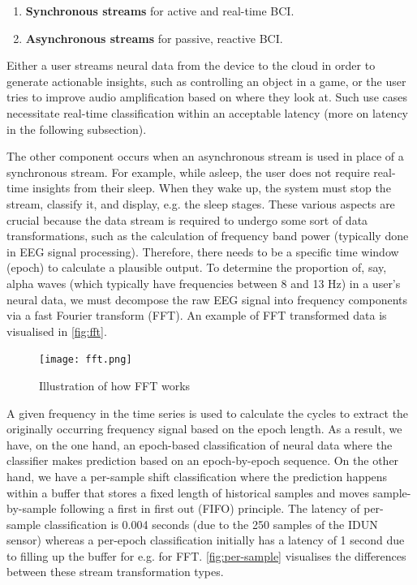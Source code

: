 \begin{enumerate}
  \item \textbf{Synchronous streams} for active and real-time BCI.
  \item \textbf{Asynchronous streams} for passive, reactive BCI.
\end{enumerate}

Either a user streams neural data from the device to the cloud in order to generate actionable insights, such as controlling an object in a game, or the user tries to improve audio amplification based on where they look at. Such use cases necessitate real-time classification within an acceptable latency (more on latency in the following subsection).

The other component occurs when an asynchronous stream is used in place of a synchronous stream. For example, while asleep, the user does not require real-time insights from their sleep. When they wake up, the system must stop the stream, classify it, and display, e.g. the sleep stages. These various aspects are crucial because the data stream is required to undergo some sort of data transformations, such as the calculation of frequency band power (typically done in EEG signal processing). Therefore, there needs to be a specific time window (epoch) to calculate a plausible output. To determine the proportion of, say, alpha waves (which typically have frequencies between 8 and 13 Hz) in a user's neural data, we must decompose the raw EEG signal into frequency components via a fast Fourier transform (FFT). An example of FFT transformed data is visualised in \autoref{fig:fft}.

\begin{figure}[!ht]
  \centering
  \texttt{[image: fft.png]}
  \caption[Illustration of how FFT works]{Illustration of how FFT works \citep{3blue1brown_but_2018}}
  \label{fig:fft}
\end{figure}

A given frequency in the time series is used to calculate the cycles to extract the originally occurring frequency signal based on the epoch length. As a result, we have, on the one hand, an epoch-based classification of neural data where the classifier makes prediction based on an epoch-by-epoch sequence. On the other hand, we have a per-sample shift classification where the prediction happens within a buffer that stores a fixed length of historical samples and moves sample-by-sample following a first in first out (FIFO) principle. The latency of per-sample classification is 0.004 seconds (due to the 250 samples of the IDUN sensor) whereas a per-epoch classification initially has a latency of 1 second due to filling up the buffer for e.g. for FFT. \autoref{fig:per-sample} visualises the differences between these stream transformation types.

